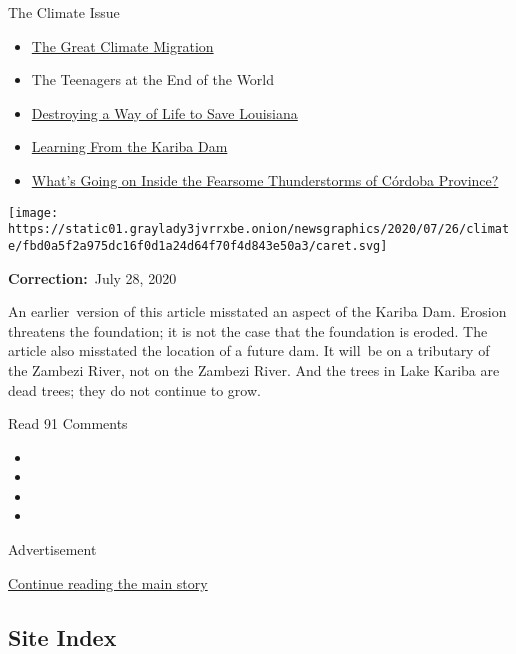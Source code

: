 The Climate Issue

\begin{itemize}
\tightlist
\item
  \href{https://www.nytimes3xbfgragh.onion/interactive/2020/07/23/magazine/climate-migration.html}{The
  Great Climate Migration}
\item
  The Teenagers at the End of the World
\item
  \href{https://www.nytimes3xbfgragh.onion/interactive/2020/07/21/magazine/louisiana-coast-engineering.html}{Destroying
  a Way of Life to Save Louisiana}
\item
  \href{https://www.nytimes3xbfgragh.onion/interactive/2020/07/22/magazine/zambia-kariba-dam.html}{Learning
  From the Kariba Dam}
\item
  \href{https://www.nytimes3xbfgragh.onion/interactive/2020/07/22/magazine/worst-storms-argentina.html}{What's
  Going on Inside the Fearsome Thunderstorms of Córdoba Province?}
\end{itemize}

\protect\hyperlink{}{} \protect\hyperlink{}{}

\texttt{[image: https://static01.graylady3jvrrxbe.onion/newsgraphics/2020/07/26/climate/fbd0a5f2a975dc16f0d1a24d64f70f4d843e50a3/caret.svg]}

\textbf{Correction:}~July 28, 2020

An earlier~version of this article misstated an aspect of the Kariba
Dam. Erosion threatens the foundation; it is not the case that the
foundation is eroded. The article also misstated the location of a
future dam. It will~be on a tributary of the Zambezi River, not on the
Zambezi River. And the trees in Lake Kariba are dead trees; they do not
continue to grow.

Read 91 Comments

\begin{itemize}
\item
\item
\item
\item
\end{itemize}

Advertisement

\protect\hyperlink{after-bottom}{Continue reading the main story}

\hypertarget{site-index}{%
\subsection{Site Index}\label{site-index}}

